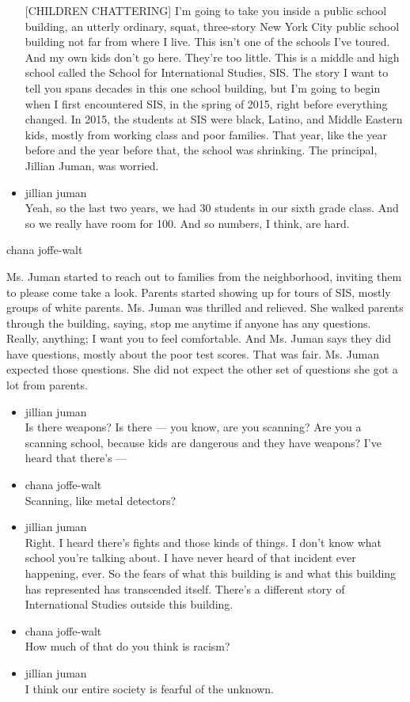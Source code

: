 \begin{itemize}
  {[}CHILDREN CHATTERING{]} I'm going to take you inside a public school
  building, an utterly ordinary, squat, three-story New York City public
  school building not far from where I live. This isn't one of the
  schools I've toured. And my own kids don't go here. They're too
  little. This is a middle and high school called the School for
  International Studies, SIS. The story I want to tell you spans decades
  in this one school building, but I'm going to begin when I first
  encountered SIS, in the spring of 2015, right before everything
  changed. In 2015, the students at SIS were black, Latino, and Middle
  Eastern kids, mostly from working class and poor families. That year,
  like the year before and the year before that, the school was
  shrinking. The principal, Jillian Juman, was worried.
\item
  jillian juman\\
  Yeah, so the last two years, we had 30 students in our sixth grade
  class. And so we really have room for 100. And so numbers, I think,
  are hard.
\end{itemize}

chana joffe-walt

Ms. Juman started to reach out to families from the neighborhood,
inviting them to please come take a look. Parents started showing up for
tours of SIS, mostly groups of white parents. Ms. Juman was thrilled and
relieved. She walked parents through the building, saying, stop me
anytime if anyone has any questions. Really, anything; I want you to
feel comfortable. And Ms. Juman says they did have questions, mostly
about the poor test scores. That was fair. Ms. Juman expected those
questions. She did not expect the other set of questions she got a lot
from parents.

\begin{itemize}
\item
  jillian juman\\
  Is there weapons? Is there --- you know, are you scanning? Are you a
  scanning school, because kids are dangerous and they have weapons?
  I've heard that there's ---
\item
  chana joffe-walt\\
  Scanning, like metal detectors?
\item
  jillian juman\\
  Right. I heard there's fights and those kinds of things. I don't know
  what school you're talking about. I have never heard of that incident
  ever happening, ever. So the fears of what this building is and what
  this building has represented has transcended itself. There's a
  different story of International Studies outside this building.
\item
  chana joffe-walt\\
  How much of that do you think is racism?
\item
  jillian juman\\
  I think our entire society is fearful of the unknown.
\end{itemize}

